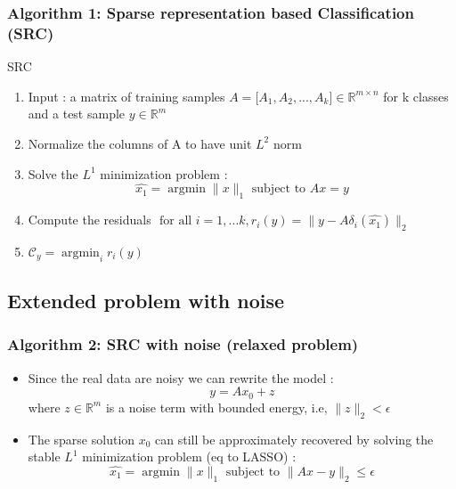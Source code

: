 \documentclass{beamer}
\DeclareMathOperator{\argmin}{argmin} %
\begin{document}

\begin{frame}


\frametitle{Algorithm 1: Sparse representation based Classification (SRC)}		
			
\begin{block}{SRC}

	\begin{enumerate}
	
	\item Input : a matrix of training samples $A=\lbrack A_{1},A_{2},...,A_{k} \rbrack \in \mathbb{R}^{m \times n}$ for k classes and a test sample $y \in \mathbb{R}^{m}$
	\item Normalize the columns of A to have unit $L^{2}$ norm
	\item Solve the $L^{1}$ minimization problem :
		$$ \hat{x_{1}}= \argmin \|x\|_{1}  \mbox{ subject to } Ax=y$$
		
	\item Compute the residuals
	$ \mbox{ for all } i=1,...k, r_{i}(y)=\|y-A\delta_{i}(\hat{x_{1}})\|_{2}$
	
	\item $\mathcal{C}_{y}=\argmin_{i} r_{i}(y)$
	
	
	\end{enumerate}



\end{block}

\end{frame}

\subsection{Extended problem with noise}


\begin{frame}

		\frametitle{Algorithm 2: SRC with noise (relaxed problem)}		

\begin{itemize}			
\item Since the real data are noisy we can rewrite the model : 
$$ y=Ax_{0}+z$$
where $z \in  \mathbb{R}^{m}$ is a noise term with bounded energy, i.e, $\|z\|_{2}< \epsilon$
\item The sparse solution $x_{0}$ can still be approximately recovered by solving the stable $L^{1}$ minimization problem (eq to LASSO) :
$$ \hat{x_{1}}= \argmin \|x\|_{1}  \mbox{ subject to } \|Ax-y\|_{2} \leq \epsilon $$
\end{itemize}
\end{frame}
\end{document}
